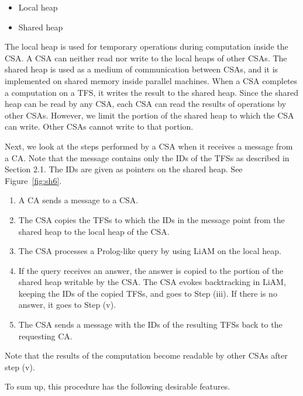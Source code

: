 \begin{itemize}
\setlength{\itemsep}{0pt plus0pt minus0pt}
\item Local heap
\item Shared heap
\end{itemize}

The local heap is used for temporary operations during computation
inside the CSA.  A CSA can neither read nor write to the local heaps
of other CSAs.  The shared heap is used as a medium of communication
between CSAs, and it is implemented on shared memory inside parallel
machines.  When a CSA completes a computation on a TFS, it writes the
result to the shared heap. Since the shared heap can be read by any
CSA, each CSA can read the results of operations by other CSAs.
However, we limit the portion of the shared heap to which the CSA can
write.  Other CSAs cannot write to that portion.

Next, we look at the steps performed by a CSA when it receives a
message from a CA. Note that the message contains only the IDs of the
TFSs as described in Section 2.1. The IDs are given as pointers on the
shared heap. See Figure~\ref{fig:sh6}.

\renewcommand{\theenumi}{}
\begin{enumerate}
\item A CA sends a message to a CSA.
\item The CSA copies the TFSs to which the IDs in the message point from the shared
heap to the local heap of the CSA.
\item The CSA processes a Prolog-like query by using LiAM on the local heap.
\item If the query receives an answer, the answer is copied to the portion of
the shared heap writable by the CSA.  The CSA evokes backtracking in
LiAM, keeping the IDs of the copied TFSs, and goes to Step (iii). If there is
no answer, it goes to Step (v).
\item The CSA sends a message with the IDs of the resulting TFSs
back to the requesting CA.
\end{enumerate}

 Note that the results of the computation become readable by other
CSAs after step (v).

  To sum up, this procedure has the following desirable features.

